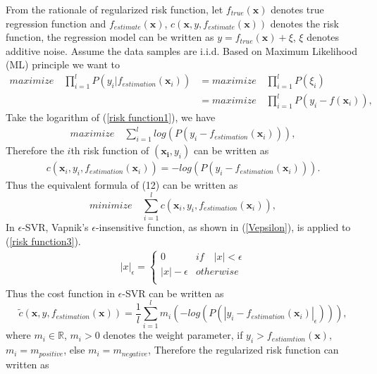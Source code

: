 \documentclass[12pt, draftclsnofoot, onecolumn]{IEEEtran}
\begin{document}
From the rationale of regularized risk function, let $f_{true}(\mathbf{x})$ denotes true regression function and $f_{estimate}(\mathbf{x})$, $c(\mathbf{x},y,f_{estimate}(\mathbf{x}))$ denotes the risk function, the regression model can be written as $y=f_{true}(\mathbf{x})+\xi$, $\xi$ denotes additive noise. Assume the data samples are i.i.d. Based on Maximum Likelihood (ML) principle we want to  
\begin{eqnarray}
\nonumber
maximize\quad \prod_{i=1}^{l}P(y_{i}|f_{estimation}(\mathbf{x}_{i}))&=maximize\quad \prod_{i=1}^{l}P(\xi_{i})\\
&=maximize\quad \prod_{i=1}^{l}P(y_{i}-f(\mathbf{x}_{i})),
\label{risk function1}
\end{eqnarray}
Take the logarithm of (\ref{risk function1}), we have
\begin{eqnarray}
maximize\quad \sum_{i=1}^{l}log(P(y_{i}-f_{estimation}(\mathbf{x}_{i}))),
\label{risk function2}
\end{eqnarray}
Therefore the $i$th risk function of $(\mathbf{x_{i}}, y_{i})$ can be written as 
\begin{eqnarray}
c(\mathbf{x}_{i}, y_{i}, f_{estimation}(\mathbf{x}_{i}))=-log(P(y_{i}-f_{estimation}(\mathbf{x}_{i}))).
\label{risk function3}
\end{eqnarray}
Thus the equivalent formula of (12) can be written as 
\begin{equation}
minimize\quad  \sum_{i=1}^{l}c(\mathbf{x}_{i}, y_{i}, f_{estimation}(\mathbf{x}_{i})),
\label{Total risk function}
\end{equation} 
In $\epsilon$-SVR, Vapnik's $\epsilon$-insensitive function, as shown in (\ref{Vepsilon}), is applied to (\ref{risk function3}).
\begin{eqnarray}
|x|_{\epsilon}=\left\{\begin{array}{ll}
0   &if\quad |x|<\epsilon\\
|x|-\epsilon  &otherwise\\
\end{array}\right.
\label{Vepsilon}
\end{eqnarray}
Thus the cost function in $\epsilon$-SVR can be written as 
\begin{equation}
\tilde{c}(\mathbf{x}, y, f_{estimation}(\mathbf{x}))=\frac{1}{l}\sum_{i=1}^{l}m_{i}(-log(P(|y_{i}-f_{estimation}(\mathbf{x}_{i})|_{\epsilon}))),
\label{cost function}
\end{equation}
where $m_{i}\in \mathbb{R}$, $m_{i}>0$ denotes the weight parameter, if $y_{i}>f_{estiamtion}(\mathbf{x})$, $m_{i}=m_{positive}$, else $m_{i}=m_{negative}$, Therefore the regularized risk function can written as 
\end{document}
